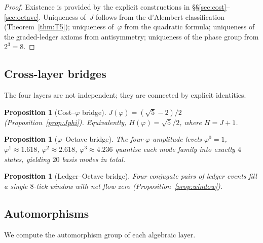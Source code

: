 \documentclass[11pt,a4paper]{article}
\theoremstyle{plain}
\newtheorem{proposition}[theorem]{Proposition}
\theoremstyle{definition}
\theoremstyle{remark}
\newcommand{\phig}{\varphi}
\newcommand{\Jcost}{J}
\begin{document}
\begin{proof}
Existence is provided by the explicit constructions in
\S\S\ref{sec:cost}--\ref{sec:octave}.  Uniqueness of~$\Jcost$
follows from the d'Alembert classification (Theorem~\ref{thm:T5});
uniqueness of~$\phig$ from the quadratic formula; uniqueness of the
graded-ledger axioms from antisymmetry; uniqueness of the phase group
from $2^3=8$.
\end{proof}

\subsection{Cross-layer bridges}

The four layers are not independent; they are connected by explicit
identities.

\begin{proposition}[Cost--$\phig$ bridge]\label{prop:cost-phi}
$\Jcost(\phig)=(\sqrt5-2)/2$ (Proposition~\ref{prop:Jphi}).
Equivalently, $H(\phig)=\sqrt5/2$, where $H=\Jcost+1$.
\end{proposition}

\begin{proposition}[$\phig$--Octave bridge]\label{prop:phi-octave}
The four $\phig$-amplitude levels $\phig^0=1$, $\phig^1\approx1.618$,
$\phig^2\approx2.618$, $\phig^3\approx4.236$ quantise each mode family
into exactly $4$ states, yielding $20$ basis modes in total.
\end{proposition}

\begin{proposition}[Ledger--Octave bridge]\label{prop:ledger-octave}
Four conjugate pairs of ledger events fill a single $8$-tick window
with net flow zero (Proposition~\ref{prop:window}).
\end{proposition}


\subsection{Automorphisms}\label{ssec:aut}

We compute the automorphism group of each algebraic layer.
\end{document}
